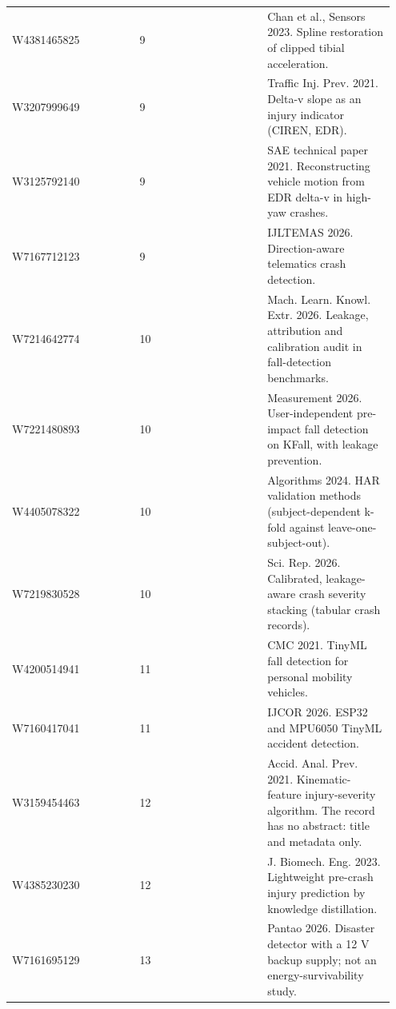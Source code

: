 {\begin{longtable}{p{0.317\linewidth}p{0.317\linewidth}p{0.317\linewidth}}
W4381465825 & 9 & Chan et al., Sensors 2023. Spline restoration of clipped tibial acceleration. \\
W3207999649 & 9 & Traffic Inj. Prev. 2021. Delta-v slope as an injury indicator (CIREN, EDR). \\
W3125792140 & 9 & SAE technical paper 2021. Reconstructing vehicle motion from EDR delta-v in high-yaw crashes. \\
W7167712123 & 9 & IJLTEMAS 2026. Direction-aware telematics crash detection. \\
W7214642774 & 10 & Mach. Learn. Knowl. Extr. 2026. Leakage, attribution and calibration audit in fall-detection benchmarks. \\
W7221480893 & 10 & Measurement 2026. User-independent pre-impact fall detection on KFall, with leakage prevention. \\
W4405078322 & 10 & Algorithms 2024. HAR validation methods (subject-dependent k-fold against leave-one-subject-out). \\
W7219830528 & 10 & Sci. Rep. 2026. Calibrated, leakage-aware crash severity stacking (tabular crash records). \\
W4200514941 & 11 & CMC 2021. TinyML fall detection for personal mobility vehicles. \\
W7160417041 & 11 & IJCOR 2026. ESP32 and MPU6050 TinyML accident detection. \\
W3159454463 & 12 & Accid. Anal. Prev. 2021. Kinematic-feature injury-severity algorithm. The record has no abstract: title and metadata only. \\
W4385230230 & 12 & J. Biomech. Eng. 2023. Lightweight pre-crash injury prediction by knowledge distillation. \\
W7161695129 & 13 & Pantao 2026. Disaster detector with a 12 V backup supply; not an energy-survivability study. \\
\bottomrule
\end{longtable}}


